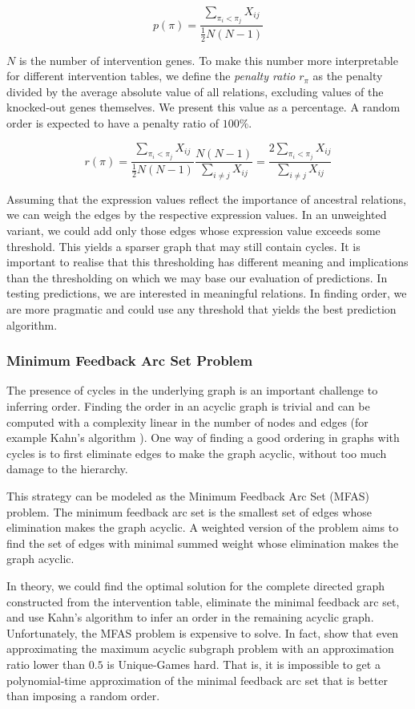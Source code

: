 $$p(\pi) = \frac{\sum_{\pi_i < \pi_j}X_{ij}}{\frac{1}{2}N(N-1)}$$

$N$ is the number of intervention genes. To make this number more interpretable for different intervention tables, we define the \textit{penalty ratio} $r_\pi$ as the penalty divided by the average absolute value of all relations, excluding values of the knocked-out genes themselves. We present this value as a percentage. A random order is expected to have a penalty ratio of $100\%$.

$$r(\pi) = \frac{\sum_{\pi_i < \pi_j}X_{ij}}{\frac{1}{2}N(N-1)} \frac{N(N-1)}{\sum_{i \neq j}X_{ij}} = \frac{2 \sum_{\pi_i < \pi_j}X_{ij}}{\sum_{i \neq j}X_{ij}}$$

Assuming that the expression values reflect the importance of ancestral relations, we can weigh the edges by the respective expression values. In an unweighted variant, we could add only those edges whose expression value exceeds some threshold. This yields a sparser graph that may still contain cycles. It is important to realise that this thresholding has different meaning and implications than the thresholding on which we may base our evaluation of predictions. In testing predictions, we are interested in meaningful relations. In finding order, we are more pragmatic and could use any threshold that yields the best prediction algorithm.

\subsubsection{Minimum Feedback Arc Set Problem}
The presence of cycles in the underlying graph is an important challenge to inferring order. Finding the order in an acyclic graph is trivial and can be computed with a complexity linear in the number of nodes and edges (for example Kahn's algorithm \citep{kahn1962topological}). One way of finding a good ordering in graphs with cycles is to first eliminate edges to make the graph acyclic, without too much damage to the hierarchy.

This strategy can be modeled as the Minimum Feedback Arc Set (MFAS) problem. The minimum feedback arc set is the smallest set of edges whose elimination makes the graph acyclic. A weighted version of the problem aims to find the set of edges with minimal summed weight whose elimination makes the graph acyclic.

In theory, we could find the optimal solution for the complete directed graph constructed from the intervention table, eliminate the minimal feedback arc set, and use Kahn's algorithm to infer an order in the remaining acyclic graph. Unfortunately, the MFAS problem is expensive to solve. In fact, \citet{guruswami2008beating} show that even approximating the maximum acyclic subgraph problem with an approximation ratio lower than $0.5$ is Unique-Games hard. That is, it is impossible to get a polynomial-time approximation of the minimal feedback arc set that is better than imposing a random order.

